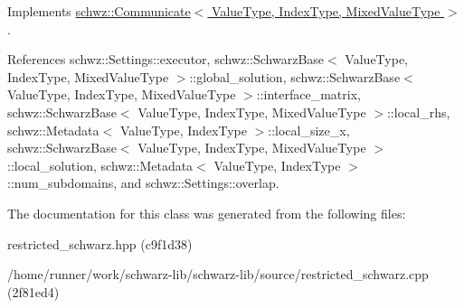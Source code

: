 Implements \hyperlink{classschwz_1_1Communicate_a371fb6c61c0bd9b619bbe7e154d18696}{schwz\+::\+Communicate$<$ Value\+Type, Index\+Type, Mixed\+Value\+Type $>$}.



References schwz\+::\+Settings\+::executor, schwz\+::\+Schwarz\+Base$<$ Value\+Type, Index\+Type, Mixed\+Value\+Type $>$\+::global\+\_\+solution, schwz\+::\+Schwarz\+Base$<$ Value\+Type, Index\+Type, Mixed\+Value\+Type $>$\+::interface\+\_\+matrix, schwz\+::\+Schwarz\+Base$<$ Value\+Type, Index\+Type, Mixed\+Value\+Type $>$\+::local\+\_\+rhs, schwz\+::\+Metadata$<$ Value\+Type, Index\+Type $>$\+::local\+\_\+size\+\_\+x, schwz\+::\+Schwarz\+Base$<$ Value\+Type, Index\+Type, Mixed\+Value\+Type $>$\+::local\+\_\+solution, schwz\+::\+Metadata$<$ Value\+Type, Index\+Type $>$\+::num\+\_\+subdomains, and schwz\+::\+Settings\+::overlap.



The documentation for this class was generated from the following files\+:\begin{DoxyCompactItemize}
\item 
restricted\+\_\+schwarz.\+hpp (c9f1d38)\item 
/home/runner/work/schwarz-\/lib/schwarz-\/lib/source/restricted\+\_\+schwarz.\+cpp (2f81ed4)\end{DoxyCompactItemize}
